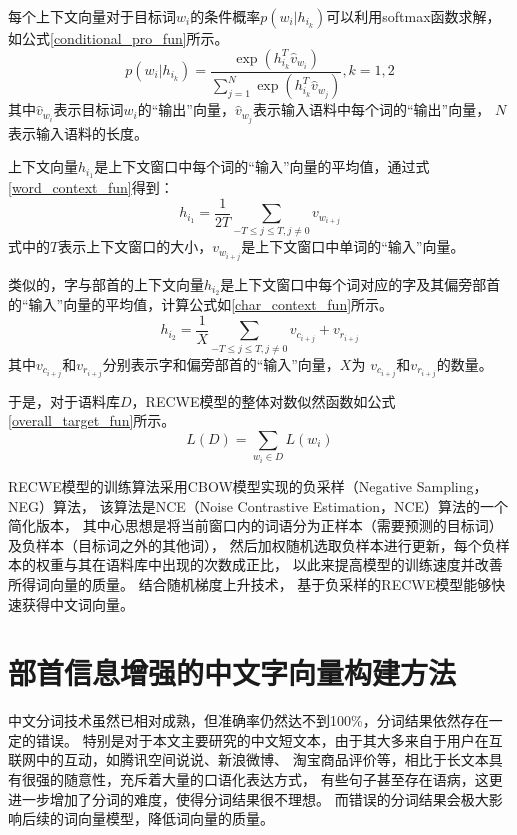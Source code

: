 每个上下文向量对于目标词$w_i$的条件概率$p\left( w_i|h_{i_k}\right )$可以利用softmax函数求解，
如公式\ref{conditional_pro_fun}所示。
\begin{equation}
    p\left ( w_i | h_{i_k} \right )=\frac{\exp \left ( h_{i_k}^{T}\hat{v}_{w_i} \right )}{\sum_{j=1}^{N}\exp \left ( h_{i_k}^{T}\hat{v}_{w_j} \right )},k=1,2
    \label{conditional_pro_fun}
\end{equation}
其中$\hat{v}_{w_i}$表示目标词$w_i$的“输出”向量，$\hat{v}_{w_j}$表示输入语料中每个词的“输出”向量，
$N$表示输入语料的长度。

上下文向量$h_{i_1}$是上下文窗口中每个词的“输入”向量的平均值，通过式\ref{word_context_fun}得到：
\begin{equation}
    h_{i_1}=\frac{1}{2T}\sum_{-T\leq j\leq T,j\neq 0}v_{w_{i+j}}
    \label{word_context_fun}
\end{equation}
式中的$T$表示上下文窗口的大小，$v_{w_{i+j}}$是上下文窗口中单词的“输入”向量。

类似的，字与部首的上下文向量$h_{i_2}$是上下文窗口中每个词对应的字及其偏旁部首的“输入”向量的平均值，计算公式如\ref{char_context_fun}所示。
\begin{equation}
    h_{i_2}=\frac{1}{X}\sum_{-T\leq j\leq T,j\neq 0} v_{c_{i+j}}+v_{r_{i+j}}
    \label{char_context_fun}
\end{equation}
其中$v_{c_{i+j}}$和$v_{r_{i+j}}$分别表示字和偏旁部首的“输入”向量，$X$为
$v_{c_{i+j}}$和$v_{r_{i+j}}$的数量。

于是，对于语料库$D$，RECWE模型的整体对数似然函数如公式\ref{overall_target_fun}所示。
\begin{equation}
    L\left ( D \right )=\sum_{w_i \in D}L\left ( w_i \right )
    \label{overall_target_fun}
\end{equation}

RECWE模型的训练算法采用CBOW模型实现的负采样（Negative Sampling，NEG）算法，
该算法是NCE（Noise Contrastive Estimation，NCE）算法的一个简化版本，
其中心思想是将当前窗口内的词语分为正样本（需要预测的目标词）及负样本（目标词之外的其他词），
然后加权随机选取负样本进行更新，每个负样本的权重与其在语料库中出现的次数成正比，
以此来提高模型的训练速度并改善所得词向量的质量。
结合随机梯度上升技术，
基于负采样的RECWE模型能够快速获得中文词向量。




\section{部首信息增强的中文字向量构建方法}
中文分词技术虽然已相对成熟，但准确率仍然达不到100\%，分词结果依然存在一定的错误。
特别是对于本文主要研究的中文短文本，由于其大多来自于用户在互联网中的互动，如腾讯空间说说、新浪微博、
淘宝商品评价等，相比于长文本具有很强的随意性，充斥着大量的口语化表达方式，
有些句子甚至存在语病，这更进一步增加了分词的难度，使得分词结果很不理想。
而错误的分词结果会极大影响后续的词向量模型，降低词向量的质量。

